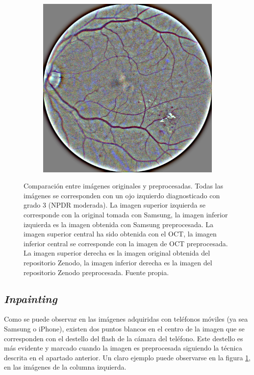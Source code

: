 \begin{figure}[!t]
\begin{subfigure}[t]{0.3\textwidth}
\end{subfigure}
\begin{subfigure}[t]{0.3\textwidth}
  \includegraphics[width=\textwidth]{img/zenodo_proc.jpg}
\end{subfigure}

\caption{Comparación entre imágenes originales y preprocesadas. Todas las imágenes se corresponden con un ojo izquierdo diagnosticado con grado 3 (NPDR moderada). La imagen superior izquierda se corresponde con la original tomada con Samsung, la imagen inferior izquierda es la imagen obtenida con Samsung preprocesada. La imagen superior central ha sido obtenida con el OCT, la imagen inferior central se corresponde con la imagen de OCT preprocesada. La imagen superior derecha es la imagen original obtenida del repositorio Zenodo, la imagen inferior derecha es la imagen del repositorio Zenodo preprocesada. Fuente propia.}
\label{fig:preproc}
\end{figure}

\subsection{\textit{Inpainting}}

Como se puede observar en las imágenes adquiridas con teléfonos móviles (ya sea Samsung o iPhone), existen dos puntos blancos en el centro de la imagen que se corresponden con el destello del flash de la cámara del teléfono. Este destello es más evidente y marcado cuando la imagen es preprocesada siguiendo la técnica descrita en el apartado anterior. Un claro ejemplo puede observarse en la figura \ref{fig:preproc}, en las imágenes de la columna izquierda.

